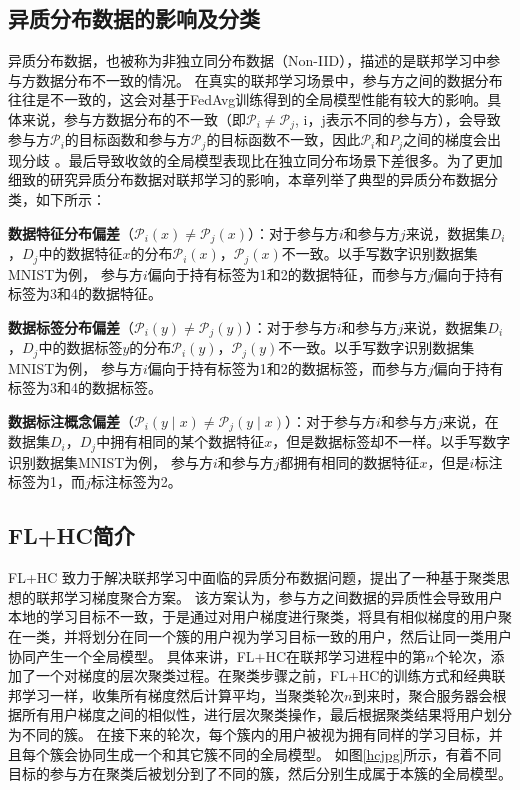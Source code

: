 \subsection{异质分布数据的影响及分类}
异质分布数据，也被称为非独立同分布数据（Non-IID），描述的是联邦学习中参与方数据分布不一致的情况。
在真实的联邦学习场景中，参与方之间的数据分布往往是不一致的，这会对基于FedAvg训练得到的全局模型性能有较大的影响。具体来说，参与方数据分布的不一致（即$\mathcal{P}_i \neq \mathcal{P}_j$, i，j表示不同的参与方），会导致参与方$\mathcal{P}_i$的目标函数和参与方$\mathcal{P}_j$的目标函数不一致，因此$\mathcal{P}_i$和$P_j$之间的梯度会出现分歧 \cite{kaissis2020secure}。最后导致收敛的全局模型表现比在独立同分布场景下差很多。为了更加细致的研究异质分布数据对联邦学习的影响，本章列举了典型的异质分布数据分类，如下所示：
\begin{compactitem}
    \item \textbf{数据特征分布偏差}（$\mathcal{P}_i(x) \neq \mathcal{P}_j(x)$）：对于参与方$i$和参与方$j$来说，数据集$D_i$，$D_j$中的数据特征$x$的分布$\mathcal{P}_i(x)$，$\mathcal{P}_j(x)$不一致。以手写数字识别数据集MNIST为例， 参与方$i$偏向于持有标签为1和2的数据特征，而参与方$j$偏向于持有标签为3和4的数据特征。
    \item \textbf{数据标签分布偏差}（$\mathcal{P}_i(y) \neq \mathcal{P}_j(y)$）：对于参与方$i$和参与方$j$来说，数据集$D_i$，$D_j$中的数据标签$y$的分布$\mathcal{P}_i(y)$，$\mathcal{P}_j(y)$不一致。以手写数字识别数据集MNIST为例， 参与方$i$偏向于持有标签为1和2的数据标签，而参与方$j$偏向于持有标签为3和4的数据标签。
    \item \textbf{数据标注概念偏差}（$\mathcal{P}_i(y \mid x) \neq\mathcal{P}_j(y \mid x)$）：对于参与方$i$和参与方$j$来说，在数据集$D_i$，$D_j$中拥有相同的某个数据特征$x$，但是数据标签却不一样。以手写数字识别数据集MNIST为例， 参与方$i$和参与方$j$都拥有相同的数据特征$x$，但是$i$标注标签为1，而$j$标注标签为2。
\end{compactitem}

\subsection{FL+HC简介}
FL+HC \cite{briggs2020federated} 致力于解决联邦学习中面临的异质分布数据问题，提出了一种基于聚类思想的联邦学习梯度聚合方案。
该方案认为，参与方之间数据的异质性会导致用户本地的学习目标不一致，于是通过对用户梯度进行聚类，将具有相似梯度的用户聚在一类，并将划分在同一个簇的用户视为学习目标一致的用户，然后让同一类用户协同产生一个全局模型。
具体来讲，FL+HC在联邦学习进程中的第$n$个轮次，添加了一个对梯度的层次聚类过程。在聚类步骤之前，FL+HC的训练方式和经典联邦学习一样，收集所有梯度然后计算平均，当聚类轮次$n$到来时，聚合服务器会根据所有用户梯度之间的相似性，进行层次聚类操作，最后根据聚类结果将用户划分为不同的簇。
在接下来的轮次，每个簇内的用户被视为拥有同样的学习目标，并且每个簇会协同生成一个和其它簇不同的全局模型。
如图\ref{hcjpg}所示，有着不同目标的参与方在聚类后被划分到了不同的簇，然后分别生成属于本簇的全局模型。

